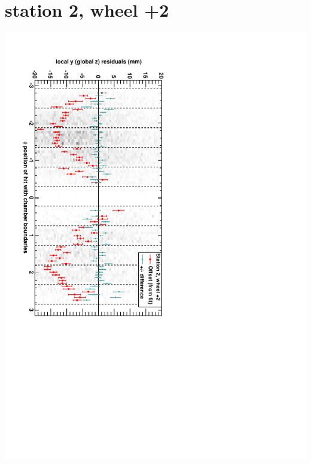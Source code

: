 \documentclass[compress]{beamer}
\begin{document}
\section*{station 2, wheel +2}
\begin{frame} \vfill \mbox{\hspace{-1 cm}\includegraphics[height=1.2\linewidth, angle=90]{DTzVsPhi_st2_whE.pdf}} \end{frame}
\end{document}
